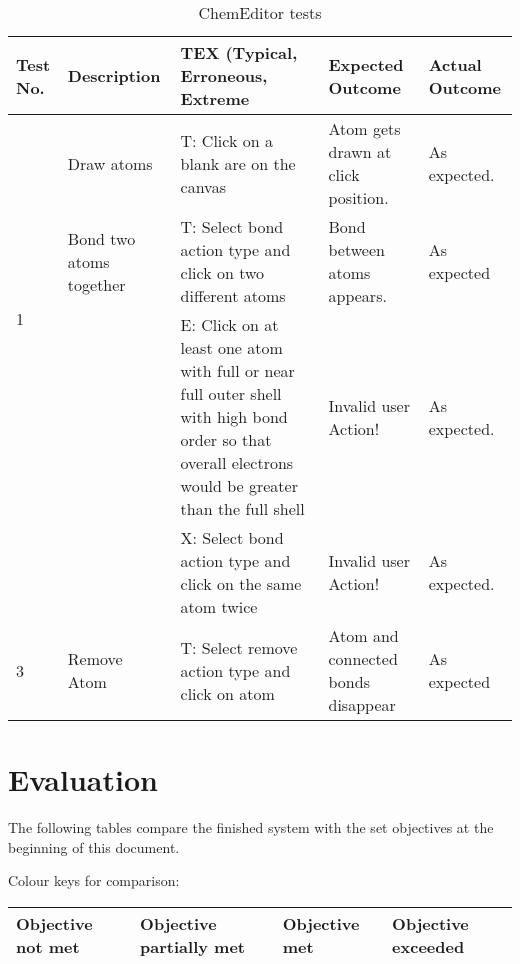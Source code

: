 \documentclass[a4paper,12pt]{article}
\begin{document}
\begin{table}[htbp]
\centering
\begin{tabularx}{\textwidth}{|p{1cm}|X|X|X|X|}
\hline
\textbf{Test No.} & \textbf{Description} & \textbf{TEX (Typical, Erroneous, Extreme} & \textbf{Expected Outcome} & \textbf{Actual Outcome} \\
\hline
\multirow{3}{*}{1} & Draw atoms & T: Click on a blank are on the canvas & Atom gets drawn at click position. & As expected.\\

\hline

\multirow{3}{*}{2} & Bond two atoms together & T: Select bond action type and click on two different atoms & Bond between atoms appears. & As expected\\
\cline{3-5}
& & E: Click on at least one atom with full or near full outer shell with high bond order so that overall electrons would be greater than the full shell & Invalid user Action! & As expected.\\
\cline{3-5}
& & X: Select bond action type and click on the same atom twice & Invalid user Action! & As expected.\\
\hline

\multirow{3}{*}{3} & Remove Atom & T: Select remove action type and click on atom & Atom and connected bonds disappear & As expected\\

\hline

\end{tabularx}
\caption{ChemEditor tests}
\label{tab:editor_tests}
\end{table}


\newpage

\section{Evaluation}

The following tables compare the finished system with the set objectives at the beginning of this document.

Colour keys for comparison:

\begin{table}[htbp]
\footnotesize
\centering
\begin{tabularx}{\textwidth}{|X|X|X|X|}

\hline
\cellcolor{red!70} Objective not met & \cellcolor{orange!70} Objective partially met & \cellcolor{cyan!70} Objective met & \cellcolor{green!70} Objective exceeded\\
\hline

\end{tabularx}
\label{tab:color_keys}
\end{table}
\end{document}
